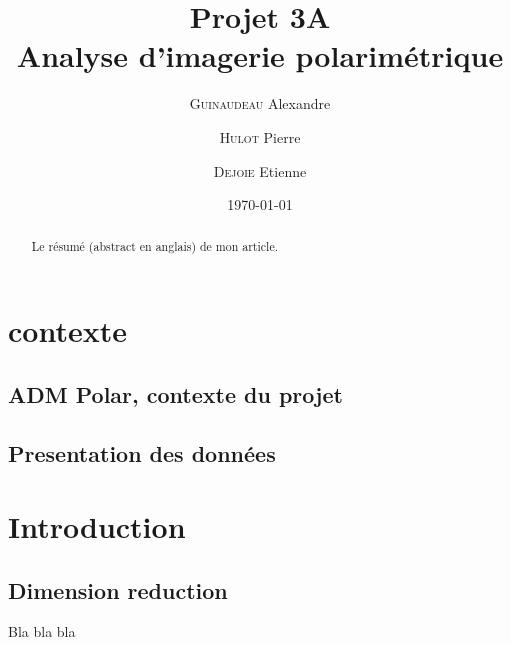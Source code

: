 \documentclass[a4paper,10pt]{report}
\title{Projet 3A\\Analyse d'imagerie polarimétrique}
\author{\textsc{Guinaudeau} Alexandre\\
	\and 
	\textsc{Hulot} Pierre
	\and 
	\textsc{Dejoie} Etienne	
	}
\date{\today}
\begin{document}
\maketitle

\begin{abstract}
Le résumé (abstract en anglais) de mon article.
\end{abstract}

\section{contexte}
\subsection{ADM Polar, contexte du projet}
\subsection{Presentation des données}

\section{Introduction}
\subsection{Dimension reduction}

\tableofcontents


Bla bla bla

\listoffigures
\listoftables
\printindex
\end{document}
